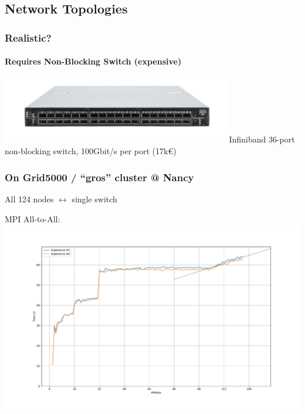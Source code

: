 \documentclass[xcolor={rgb,x11names,svgnames},rgb,x11names,svgnames]{beamer}
\begin{document}
\subsection{Network Topologies}


\begin{frame}
  \frametitle{Realistic?}
  \framesubtitle{Requires \textbf{Non-Blocking} Switch (expensive)}

  \centering
  \includegraphics[width=10cm]{ib_switch.jpg}
  Infiniband 36-port non-blocking switch, 100Gbit/s per port (17k€)
\end{frame}


\begin{frame}
  \frametitle{On Grid5000 / ``gros'' cluster @ Nancy}
  All 124 nodes $\leftrightarrow$ single switch

  \centering
  MPI All-to-All:
  \includegraphics[width=\textwidth]{gros_sort.pdf}
\end{frame}
\end{document}
